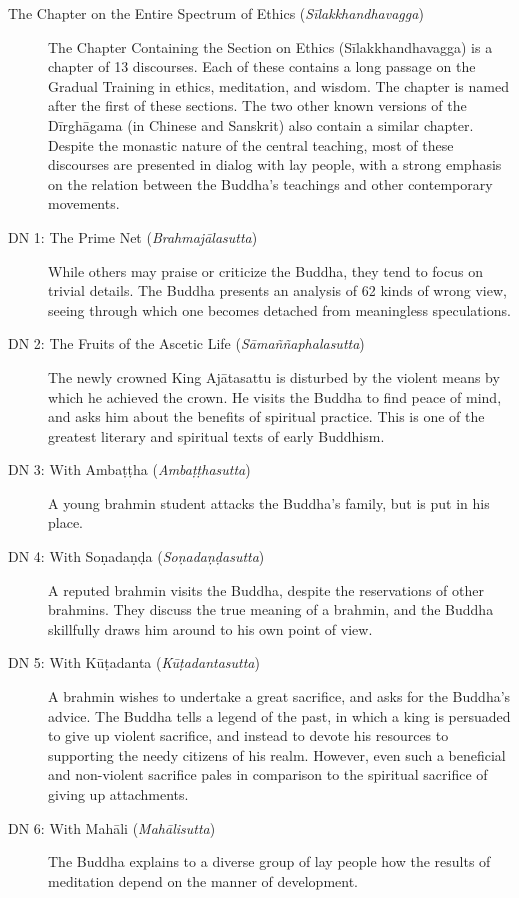 \documentclass[12pt,openany]{book}%
\begin{document}
\begin{description}%
\item[The Chapter on the Entire Spectrum of Ethics (\textit{\textsanskrit{Sīlakkhandhavagga}})] The Chapter Containing the Section on Ethics (\textsanskrit{Sīlakkhandhavagga}) is a chapter of 13 discourses. Each of these contains a long passage on the Gradual Training in ethics, meditation, and wisdom. The chapter is named after the first of these sections. The two other known versions of the \textsanskrit{Dīrghāgama} (in Chinese and Sanskrit) also contain a similar chapter. Despite the monastic nature of the central teaching, most of these discourses are presented in dialog with lay people, with a strong emphasis on the relation between the Buddha’s teachings and other contemporary movements.%
\item[DN 1: The Prime Net (\textit{\textsanskrit{Brahmajālasutta}})] While others may praise or criticize the Buddha, they tend to focus on trivial details. The Buddha presents an analysis of 62 kinds of wrong view, seeing through which one becomes detached from meaningless speculations.%
\item[DN 2: The Fruits of the Ascetic Life (\textit{\textsanskrit{Sāmaññaphalasutta}})] The newly crowned King \textsanskrit{Ajātasattu} is disturbed by the violent means by which he achieved the crown. He visits the Buddha to find peace of mind, and asks him about the benefits of spiritual practice. This is one of the greatest literary and spiritual texts of early Buddhism.%
\item[DN 3: With \textsanskrit{Ambaṭṭha} (\textit{\textsanskrit{Ambaṭṭhasutta}})] A young brahmin student attacks the Buddha’s family, but is put in his place.%
\item[DN 4: With \textsanskrit{Soṇadaṇḍa} (\textit{\textsanskrit{Soṇadaṇḍasutta}})] A reputed brahmin visits the Buddha, despite the reservations of other brahmins. They discuss the true meaning of a brahmin, and the Buddha skillfully draws him around to his own point of view.%
\item[DN 5: With \textsanskrit{Kūṭadanta} (\textit{\textsanskrit{Kūṭadantasutta}})] A brahmin wishes to undertake a great sacrifice, and asks for the Buddha’s advice. The Buddha tells a legend of the past, in which a king is persuaded to give up violent sacrifice, and instead to devote his resources to supporting the needy citizens of his realm. However, even such a beneficial and non-violent sacrifice pales in comparison to the spiritual sacrifice of giving up attachments.%
\item[DN 6: With \textsanskrit{Mahāli} (\textit{\textsanskrit{Mahālisutta}})] The Buddha explains to a diverse group of lay people how the results of meditation depend on the manner of development.%

\end{description}
\end{document}
